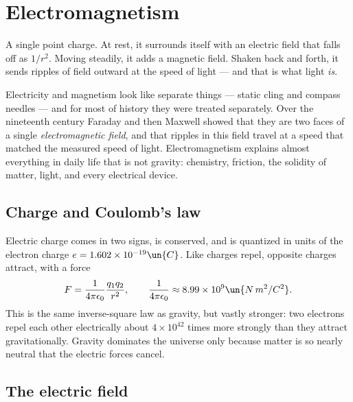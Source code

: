 \chapter{Electromagnetism}
\label{ch:em}



\begin{prototype}
A single point charge. At rest, it surrounds itself with an electric field that falls off as $1/r^2$. Moving steadily, it adds a magnetic field. Shaken back and forth, it sends ripples of field outward at the speed of light --- and that is what light \emph{is}.
\end{prototype}

Electricity and magnetism look like separate things --- static cling and compass needles --- and for most of history they were treated separately. Over the nineteenth century Faraday and then Maxwell showed that they are two faces of a single \emph{electromagnetic field}, and that ripples in this field travel at a speed that matched the measured speed of light. Electromagnetism explains almost everything in daily life that is not gravity: chemistry, friction, the solidity of matter, light, and every electrical device.

\section{Charge and Coulomb's law}

Electric charge comes in two signs, is conserved, and is quantized in units of the electron charge $e = 1.602\times10^{-19}\un{C}$. Like charges repel, opposite charges attract, with a force
\[
  F = \frac{1}{4\pi\epsilon_0}\frac{q_1q_2}{r^2}, \qquad \frac{1}{4\pi\epsilon_0} \approx 8.99\times10^{9}\un{N\,m^2/C^2}.
\]
This is the same inverse-square law as gravity, but vastly stronger: two electrons repel each other electrically about $4\times10^{42}$ times more strongly than they attract gravitationally. Gravity dominates the universe only because matter is so nearly neutral that the electric forces cancel.

\section{The electric field}

